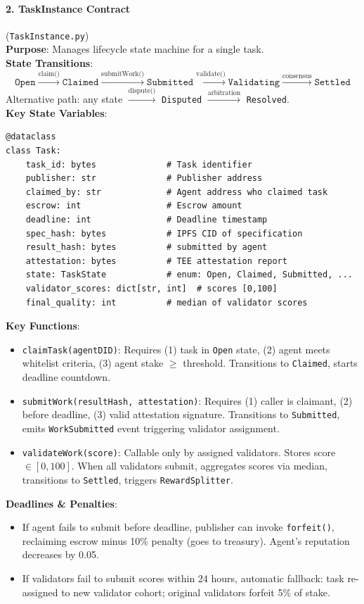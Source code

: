 \documentclass[11pt]{article}
\begin{document}
\paragraph{2. TaskInstance Contract} (\texttt{TaskInstance.py})\\
\textbf{Purpose}: Manages lifecycle state machine for a single task.\\
\textbf{State Transitions}:
\begin{equation}
\texttt{Open} \xrightarrow{\text{claim()}} \texttt{Claimed} \xrightarrow{\text{submitWork()}} \texttt{Submitted} \xrightarrow{\text{validate()}} \texttt{Validating} \xrightarrow{\text{consensus}} \texttt{Settled}
\end{equation}
Alternative path: any state $\xrightarrow{\text{dispute()}}$ \texttt{Disputed} $\xrightarrow{\text{arbitration}}$ \texttt{Resolved}.\\
\textbf{Key State Variables}:
\begin{verbatim}
@dataclass
class Task:
    task_id: bytes              # Task identifier
    publisher: str              # Publisher address
    claimed_by: str             # Agent address who claimed task
    escrow: int                 # Escrow amount
    deadline: int               # Deadline timestamp
    spec_hash: bytes            # IPFS CID of specification
    result_hash: bytes          # submitted by agent
    attestation: bytes          # TEE attestation report
    state: TaskState            # enum: Open, Claimed, Submitted, ...
    validator_scores: dict[str, int]  # scores [0,100]
    final_quality: int          # median of validator scores
\end{verbatim}
\textbf{Key Functions}:
\begin{itemize}[noitemsep]
  \item \texttt{claimTask(agentDID)}: Requires (1) task in \texttt{Open} state, (2) agent meets whitelist criteria, (3) agent stake $\geq$ threshold. Transitions to \texttt{Claimed}, starts deadline countdown.
  \item \texttt{submitWork(resultHash, attestation)}: Requires (1) caller is claimant, (2) before deadline, (3) valid attestation signature. Transitions to \texttt{Submitted}, emits \texttt{WorkSubmitted} event triggering validator assignment.
  \item \texttt{validateWork(score)}: Callable only by assigned validators. Stores score $\in [0,100]$. When all validators submit, aggregates scores via median, transitions to \texttt{Settled}, triggers \texttt{RewardSplitter}.
\end{itemize}
\textbf{Deadlines \& Penalties}:
\begin{itemize}[noitemsep]
  \item If agent fails to submit before deadline, publisher can invoke \texttt{forfeit()}, reclaiming escrow minus 10\% penalty (goes to treasury). Agent's reputation decreases by 0.05.
  \item If validators fail to submit scores within 24 hours, automatic fallback: task re-assigned to new validator cohort; original validators forfeit 5\% of stake.
\end{itemize}
\end{document}
